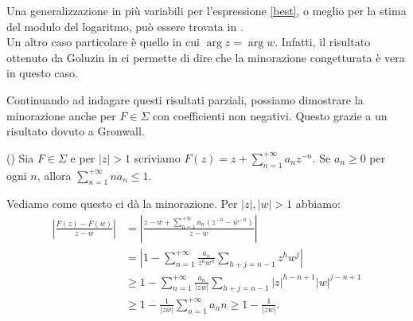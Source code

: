 Una generalizzazione in più variabili per l'espressione \eqref{best}, o meglio per la stima del modulo del logaritmo, può essere trovata in \cite[Chapter IV.2, Theorem 3]{Gol1}. \\

Un altro caso particolare è quello in cui $\arg{z}=\arg{w}$. Infatti, il risultato ottenuto da Goluzin in \cite[Section 1, Inequality (30)]{Gol2} ci permette di dire che la minorazione congetturata è vera in questo caso.

Continuando ad indagare questi risultati parziali, possiamo dimostrare la minorazione anche per $F \in \Sigma$ con coefficienti non negativi. Questo grazie a un risultato dovuto a Gronwall.

\begin{prop}
  (\cite[Section 2, third to last Inequality]{Gr}) Sia $F \in \Sigma$ e per $|z|>1$ scriviamo $F(z)=z+\displaystyle \sum_{n=1}^{+\infty} a_nz^{-n}$. Se $a_n \ge 0$ per ogni $n$, allora $\displaystyle \sum_{n=1}^{+\infty} na_n \le 1$.
\end{prop}

Vediamo come questo ci dà la minorazione. Per $|z|,|w|>1$ abbiamo:
\begin{align*}
  \left|\frac{F(z)-F(w)}{z-w}\right|&=\left|\frac{z-w+\sum_{n=1}^{+\infty}a_n(z^{-n}-w^{-n})}{z-w}\right| \\
  &=\left|1-\sum_{n=1}^{+\infty} \frac{a_n}{z^nw^n}\sum_{h+j=n-1}z^hw^j\right| \\
  &\ge 1-\sum_{n=1}^{+\infty} \frac{a_n}{|zw|}\sum_{h+j=n-1}|z|^{h-n+1}|w|^{j-n+1} \\
  & \ge 1-\frac{1}{|zw|}\sum_{n=1}^{+\infty} a_nn \ge 1-\frac{1}{|zw|}.
\end{align*}

